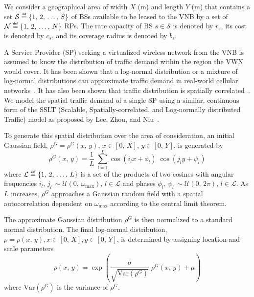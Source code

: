 \documentclass[12pt,dvipsnames]{report}
\newcommand\defeq{\mathrel{\overset{\makebox[0pt]{\mbox{\normalfont\tiny\sffamily def}}}{=}}}
\begin{document}
We consider a geographical area of width $X$ (m) and length $Y$ (m) that contains a set $\mathcal{S} \defeq \left\{1,\, 2,\, \ldots,\, S\right\}$ of BSs available to be leased to the VNB by a set of $\mathcal{N} \defeq \left\{1,\, 2,\, \ldots,\, N\right\}$ RPs.  The rate capacity of BS $s \in \mathcal{S}$ is denoted by $r_s$, its cost is denoted by $c_s$, and its coverage radius is denoted by $b_s$.

A Service Provider (SP) seeking a virtualized wireless network from the VNB is assumed to know the distribution of traffic demand within the region the VWN would cover.  It has been shown that a log-normal distribution or a mixture of log-normal distributions can approximate traffic demand in real-world cellular networks~\cite{686105, 5936263}.  It has also been shown that traffic distribution is spatially correlated~\cite{5936263, eigenplaces}.  We model the spatial traffic demand of a single SP using a similar, continuous form of the SSLT (Scalable, Spatially-correlated, and Log-normally distributed Traffic) model as proposed by Lee, Zhou, and Niu~\cite{6554749}.

To generate this spatial distribution over the area of consideration, an initial Gaussian field, $\rho^G = \rho^G\left(x,\, y\right),\, x \in \left[0,\, X\right],\, y \in \left[0,\, Y\right]$, is generated by
\begin{equation}
\rho^G\left(x,\, y\right)=\frac{1}{L} \; \sum_{l=1}^L \cos\left(i_lx+\phi_l\right) \; \cos\left(j_ly+\psi_l\right)
\end{equation} \label{eq:rhoG}
\noindent where $\mathcal{L} \defeq \left\{1,\, 2,\, \ldots,\, L\right\}$ is a set of the products of two cosines with angular frequencies $i_l,\, j_l\, \sim \mathcal{U}\left(0,\, \omega_{\max}\right),\, l \in \mathcal{L}$ and phases $\phi_l,\, \psi_l\, \sim \mathcal{U}\left(0,\, 2\pi\right),\, l \in \mathcal{L}$.  As $L$ increases, $\rho^G$ approaches a Gaussian random field with a spatial autocorrelation dependent on $\omega_{\max}$ according to the central limit theorem.

The approximate Gaussian distribution $\rho^G$ is then normalized to a standard normal distribution.  The final log-normal distribution, $\rho = \rho\left(x,\, y\right), x \in [0,\, X], y \in [0,\, Y]$, is determined by assigning location and scale parameters
\begin{equation}
\rho\left(x,\, y\right) = \exp\left(\frac{\sigma}{\sqrt{\text{Var}\left(\rho^G\right)}} \; \rho^G\left(x,\, y\right)+\mu\right)
\end{equation} \label{eq:rhoLN}
\noindent where $\text{Var}\left(\rho^G\right)$ is the variance of $\rho^G$.
\end{document}

